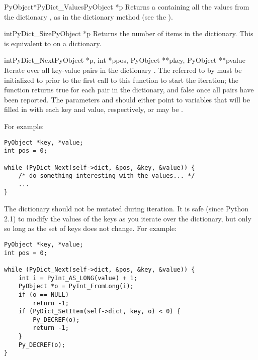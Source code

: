 \begin{cfuncdesc}{PyObject*}{PyDict_Values}{PyObject *p}
  Returns a  containing all the values from the
  dictionary , as in the dictionary method 
  (see the ).
\end{cfuncdesc}

\begin{cfuncdesc}{int}{PyDict_Size}{PyObject *p}
  Returns the number of items in the dictionary.  This is equivalent
  to  on a dictionary.
\end{cfuncdesc}

\begin{cfuncdesc}{int}{PyDict_Next}{PyObject *p, int *ppos,
                                    PyObject **pkey, PyObject **pvalue}
  Iterate over all key-value pairs in the dictionary .  The
   referred to by  must be initialized to
   prior to the first call to this function to start the
  iteration; the function returns true for each pair in the
  dictionary, and false once all pairs have been reported.  The
  parameters  and  should either point to
   variables that will be filled in with each key and
  value, respectively, or may be \NULL.

  For example:

\begin{verbatim}
PyObject *key, *value;
int pos = 0;

while (PyDict_Next(self->dict, &pos, &key, &value)) {
    /* do something interesting with the values... */
    ...
}
\end{verbatim}

  The dictionary  should not be mutated during iteration.  It
  is safe (since Python 2.1) to modify the values of the keys as you
  iterate over the dictionary, but only so long as the set of keys
  does not change.  For example:

\begin{verbatim}
PyObject *key, *value;
int pos = 0;

while (PyDict_Next(self->dict, &pos, &key, &value)) {
    int i = PyInt_AS_LONG(value) + 1;
    PyObject *o = PyInt_FromLong(i);
    if (o == NULL)
        return -1;
    if (PyDict_SetItem(self->dict, key, o) < 0) {
        Py_DECREF(o);
        return -1;
    }
    Py_DECREF(o);
}
\end{verbatim}
\end{cfuncdesc}

